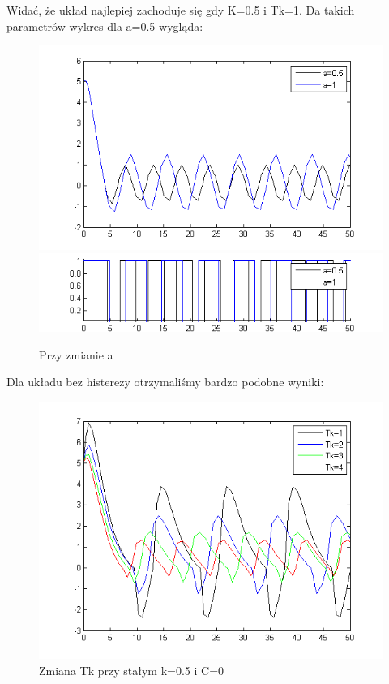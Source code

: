 \documentclass[a4paper,10pt]{article}
\begin{document}
\begin{enumerate}
\newpage
Widać, że układ najlepiej zachoduje się gdy K=0.5 i Tk=1.
Da takich parametrów wykres dla a=0.5 wygląda:
\begin{figure}[!h]
    \centering
	\includegraphics[width=120mm]{CW3-korekcja-dwupolozeniowy-e_a.png}
	\includegraphics[width=120mm]{CW3-korekcja-dwupolozeniowy-u_a.png}
	\caption{Przy zmianie a}
    \label{fig:Rysunek}
\end{figure}


\newpage

Dla układu bez histerezy otrzymaliśmy bardzo podobne wyniki:
\begin{figure}[!h]
    \centering
	\includegraphics[width=120mm]{CW3-korekcja-dwupolozeniowyBH-e_Tk.png}
	\caption{Zmiana Tk przy stałym k=0.5 i C=0}
    \label{fig:Rysunek}
\end{figure}


\end{enumerate}
\end{document}
